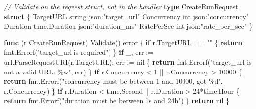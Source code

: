 \documentclass[
]{article}
\newenvironment{Shaded}{}{}
\newcommand{\CommentTok}[1]{\textcolor[rgb]{0.38,0.63,0.69}{\textit{#1}}}
\newcommand{\ControlFlowTok}[1]{\textcolor[rgb]{0.00,0.44,0.13}{\textbf{#1}}}
\newcommand{\DataTypeTok}[1]{\textcolor[rgb]{0.56,0.13,0.00}{#1}}
\newcommand{\DecValTok}[1]{\textcolor[rgb]{0.25,0.63,0.44}{#1}}
\newcommand{\KeywordTok}[1]{\textcolor[rgb]{0.00,0.44,0.13}{\textbf{#1}}}
\newcommand{\NormalTok}[1]{#1}
\newcommand{\OperatorTok}[1]{\textcolor[rgb]{0.40,0.40,0.40}{#1}}
\newcommand{\OtherTok}[1]{\textcolor[rgb]{0.00,0.44,0.13}{#1}}
\newcommand{\StringTok}[1]{\textcolor[rgb]{0.25,0.44,0.63}{#1}}
\begin{document}
\begin{Shaded}
\begin{Highlighting}[]
\CommentTok{// Validate on the request struct, not in the handler}
\KeywordTok{type}\NormalTok{ CreateRunRequest }\KeywordTok{struct} \OperatorTok{\{}
\NormalTok{    TargetURL   }\DataTypeTok{string}        \StringTok{\textasciigrave{}json:"target\_url"\textasciigrave{}}
\NormalTok{    Concurrency }\DataTypeTok{int}           \StringTok{\textasciigrave{}json:"concurrency"\textasciigrave{}}
\NormalTok{    Duration    time}\OperatorTok{.}\NormalTok{Duration }\StringTok{\textasciigrave{}json:"duration\_ms"\textasciigrave{}}
\NormalTok{    RatePerSec  }\DataTypeTok{int}           \StringTok{\textasciigrave{}json:"rate\_per\_sec"\textasciigrave{}}
\OperatorTok{\}}

\KeywordTok{func} \OperatorTok{(}\NormalTok{r CreateRunRequest}\OperatorTok{)}\NormalTok{ Validate}\OperatorTok{()} \DataTypeTok{error} \OperatorTok{\{}
    \ControlFlowTok{if}\NormalTok{ r}\OperatorTok{.}\NormalTok{TargetURL }\OperatorTok{==} \StringTok{""} \OperatorTok{\{}
        \ControlFlowTok{return}\NormalTok{ fmt}\OperatorTok{.}\NormalTok{Errorf}\OperatorTok{(}\StringTok{"target\_url is required"}\OperatorTok{)}
    \OperatorTok{\}}
    \ControlFlowTok{if}\NormalTok{ \_}\OperatorTok{,}\NormalTok{ err }\OperatorTok{:=}\NormalTok{ url}\OperatorTok{.}\NormalTok{ParseRequestURI}\OperatorTok{(}\NormalTok{r}\OperatorTok{.}\NormalTok{TargetURL}\OperatorTok{);}\NormalTok{ err }\OperatorTok{!=} \OtherTok{nil} \OperatorTok{\{}
        \ControlFlowTok{return}\NormalTok{ fmt}\OperatorTok{.}\NormalTok{Errorf}\OperatorTok{(}\StringTok{"target\_url is not a valid URL: \%w"}\OperatorTok{,}\NormalTok{ err}\OperatorTok{)}
    \OperatorTok{\}}
    \ControlFlowTok{if}\NormalTok{ r}\OperatorTok{.}\NormalTok{Concurrency }\OperatorTok{\textless{}} \DecValTok{1} \OperatorTok{||}\NormalTok{ r}\OperatorTok{.}\NormalTok{Concurrency }\OperatorTok{\textgreater{}} \DecValTok{10000} \OperatorTok{\{}
        \ControlFlowTok{return}\NormalTok{ fmt}\OperatorTok{.}\NormalTok{Errorf}\OperatorTok{(}\StringTok{"concurrency must be between 1 and 10000, got \%d"}\OperatorTok{,}\NormalTok{ r}\OperatorTok{.}\NormalTok{Concurrency}\OperatorTok{)}
    \OperatorTok{\}}
    \ControlFlowTok{if}\NormalTok{ r}\OperatorTok{.}\NormalTok{Duration }\OperatorTok{\textless{}}\NormalTok{ time}\OperatorTok{.}\NormalTok{Second }\OperatorTok{||}\NormalTok{ r}\OperatorTok{.}\NormalTok{Duration }\OperatorTok{\textgreater{}} \DecValTok{24}\OperatorTok{*}\NormalTok{time}\OperatorTok{.}\NormalTok{Hour }\OperatorTok{\{}
        \ControlFlowTok{return}\NormalTok{ fmt}\OperatorTok{.}\NormalTok{Errorf}\OperatorTok{(}\StringTok{"duration must be between 1s and 24h"}\OperatorTok{)}
    \OperatorTok{\}}
    \ControlFlowTok{return} \OtherTok{nil}
\OperatorTok{\}}
\end{Highlighting}
\end{Shaded}
\end{document}
